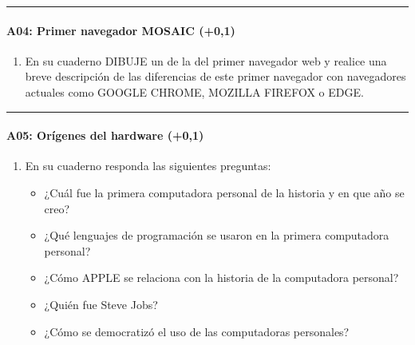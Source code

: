\documentclass[letterpaper,10pt,spanish]{sphinxmanual}
\begin{document}
\bigskip\hrule\bigskip



\paragraph{A04: Primer navegador MOSAIC (+0,1)}
\label{\detokenize{cursos/informatica10/periodo01/G01:a04-primer-navegador-mosaic-0-1}}
\sphinxAtStartPar
{}
\begin{enumerate}
%
\item {} 
\sphinxAtStartPar
En su cuaderno DIBUJE un  de la  del primer navegador web  y realice una breve descripción de las diferencias de este primer navegador con navegadores actuales como GOOGLE CHROME, MOZILLA FIREFOX o EDGE.

\end{enumerate}


\bigskip\hrule\bigskip



\paragraph{A05: Orígenes del hardware (+0,1)}
\label{\detokenize{cursos/informatica10/periodo01/G01:a05-origenes-del-hardware-0-1}}
\sphinxAtStartPar
{}
\begin{enumerate}
%
\item {} 
\sphinxAtStartPar
En su cuaderno responda las siguientes preguntas:
\begin{itemize}
\item {} 
\sphinxAtStartPar
¿Cuál fue la primera computadora personal de la historia y en que año se creo?

\item {} 
\sphinxAtStartPar
¿Qué lenguajes de programación se usaron en la primera computadora personal?

\item {} 
\sphinxAtStartPar
¿Cómo APPLE se relaciona con la historia de la computadora personal?

\item {} 
\sphinxAtStartPar
¿Quién fue Steve Jobs?

\item {} 
\sphinxAtStartPar
¿Cómo se democratizó el uso de las computadoras personales?

\end{itemize}

\end{enumerate}
\end{document}
